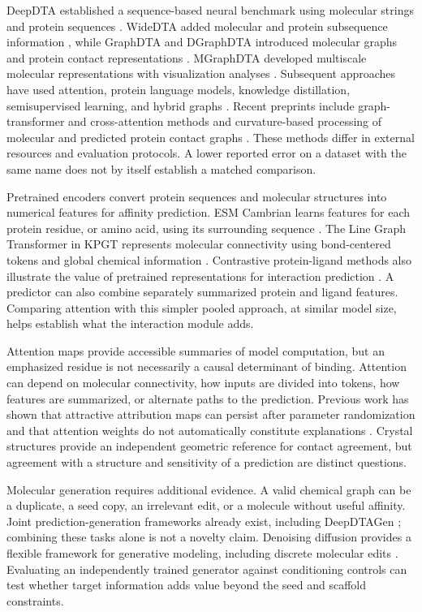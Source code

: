 \documentclass[12pt,a4paper]{article}
\begin{document}
DeepDTA established a sequence-based neural benchmark using molecular strings and protein sequences \citep{deepdta2018}. WideDTA added molecular and protein subsequence information \citep{widedta2019}, while GraphDTA and DGraphDTA introduced molecular graphs and protein contact representations \citep{graphdta2021,dgraph2020}. MGraphDTA developed multiscale molecular representations with visualization analyses \citep{mgraph2022}. Subsequent approaches have used attention, protein language models, knowledge distillation, semisupervised learning, and hybrid graphs \citep{fusion2022,ssm2023,nhgnn2023}. Recent preprints include graph-transformer and cross-attention methods and curvature-based processing of molecular and predicted protein contact graphs \citep{hgtdp2024,hcaf2025,curvflow2026}. These methods differ in external resources and evaluation protocols. A lower reported error on a dataset with the same name does not by itself establish a matched comparison.

Pretrained encoders convert protein sequences and molecular structures into numerical features for affinity prediction. ESM Cambrian learns features for each protein residue, or amino acid, using its surrounding sequence \citep{esmc2024,esmcode}. The Line Graph Transformer in KPGT represents molecular connectivity using bond-centered tokens and global chemical information \citep{light2023}. Contrastive protein-ligand methods also illustrate the value of pretrained representations for interaction prediction \citep{conplex2023}. A predictor can also combine separately summarized protein and ligand features. Comparing attention with this simpler pooled approach, at similar model size, helps establish what the interaction module adds.

Attention maps provide accessible summaries of model computation, but an emphasized residue is not necessarily a causal determinant of binding. Attention can depend on molecular connectivity, how inputs are divided into tokens, how features are summarized, or alternate paths to the prediction. Previous work has shown that attractive attribution maps can persist after parameter randomization and that attention weights do not automatically constitute explanations \citep{attention2019,sanity2018}. Crystal structures provide an independent geometric reference for contact agreement, but agreement with a structure and sensitivity of a prediction are distinct questions.

Molecular generation requires additional evidence. A valid chemical graph can be a duplicate, a seed copy, an irrelevant edit, or a molecule without useful affinity. Joint prediction-generation frameworks already exist, including DeepDTAGen \citep{deepdtagen2025}; combining these tasks alone is not a novelty claim. Denoising diffusion provides a flexible framework for generative modeling, including discrete molecular edits \citep{ho2020,discrete2021}. Evaluating an independently trained generator against conditioning controls can test whether target information adds value beyond the seed and scaffold constraints.
\end{document}
